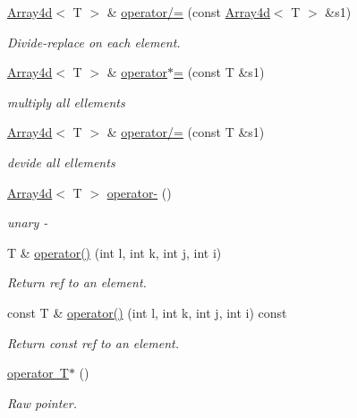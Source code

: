 \begin{DoxyCompactItemize}
\mbox{\hyperlink{classXMLArray_1_1Array4d}{Array4d}}$<$ T $>$ \& \mbox{\hyperlink{classXMLArray_1_1Array4d_ac8d0ba2bc4f085bf48baf6530db0cfcb}{operator/=}} (const \mbox{\hyperlink{classXMLArray_1_1Array4d}{Array4d}}$<$ T $>$ \&s1)
\begin{DoxyCompactList}\small\item\em Divide-\/replace on each element. \end{DoxyCompactList}\item 
\mbox{\hyperlink{classXMLArray_1_1Array4d}{Array4d}}$<$ T $>$ \& \mbox{\hyperlink{classXMLArray_1_1Array4d_ac8c9fbcc39636658f94e7adc00c172b3}{operator$\ast$=}} (const T \&s1)
\begin{DoxyCompactList}\small\item\em multiply all ellements \end{DoxyCompactList}\item 
\mbox{\hyperlink{classXMLArray_1_1Array4d}{Array4d}}$<$ T $>$ \& \mbox{\hyperlink{classXMLArray_1_1Array4d_a22b262f7b7905313ae8e21d5e2d717a7}{operator/=}} (const T \&s1)
\begin{DoxyCompactList}\small\item\em devide all ellements \end{DoxyCompactList}\item 
\mbox{\hyperlink{classXMLArray_1_1Array4d}{Array4d}}$<$ T $>$ \mbox{\hyperlink{classXMLArray_1_1Array4d_a33d29c88630265c416d8e8a7355f166e}{operator-\/}} ()
\begin{DoxyCompactList}\small\item\em unary -\/ \end{DoxyCompactList}\item 
T \& \mbox{\hyperlink{classXMLArray_1_1Array4d_aed3f4e517b15358348150e8212189b60}{operator()}} (int l, int k, int j, int i)
\begin{DoxyCompactList}\small\item\em Return ref to an element. \end{DoxyCompactList}\item 
const T \& \mbox{\hyperlink{classXMLArray_1_1Array4d_ae9076800aed9ec98d434d01fcaf4ba3a}{operator()}} (int l, int k, int j, int i) const
\begin{DoxyCompactList}\small\item\em Return const ref to an element. \end{DoxyCompactList}\item 
\mbox{\hyperlink{classXMLArray_1_1Array4d_a25e918248c9191d04788cce2e0116bf1}{operator T$\ast$}} ()
\begin{DoxyCompactList}\small\item\em Raw pointer. \end{DoxyCompactList}\item 

\end{DoxyCompactItemize}
